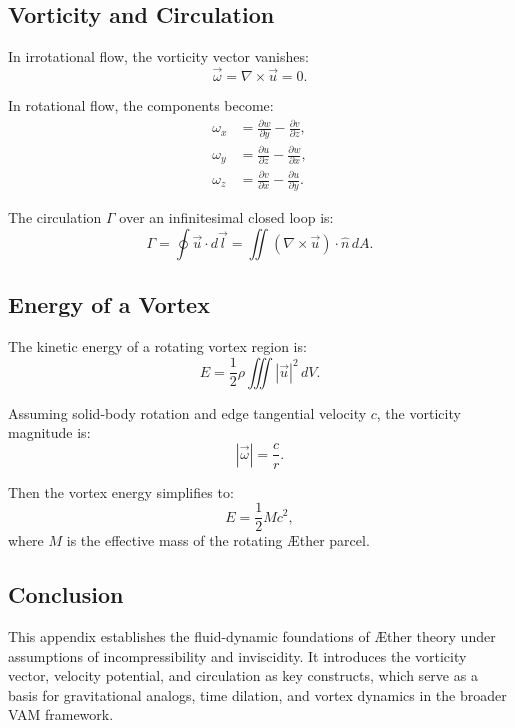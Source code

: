\documentclass[12pt]{article}
\begin{document}
    \subsection{Vorticity and Circulation}
    In irrotational flow, the vorticity vector vanishes:
    \begin{equation}
        \vec{\omega} = \nabla \times \vec{u} = 0.
    \end{equation}

    In rotational flow, the components become:
    \begin{align}
        \omega_x &= \frac{\partial w}{\partial y} - \frac{\partial v}{\partial z}, \\
        \omega_y &= \frac{\partial u}{\partial z} - \frac{\partial w}{\partial x}, \\
        \omega_z &= \frac{\partial v}{\partial x} - \frac{\partial u}{\partial y}.
    \end{align}

    The circulation \(\Gamma\) over an infinitesimal closed loop is:
    \begin{equation}
        \Gamma = \oint \vec{u} \cdot d\vec{l} = \iint (\nabla \times \vec{u}) \cdot \hat{n} \, dA.
    \end{equation}

    \subsection{Energy of a Vortex}
    The kinetic energy of a rotating vortex region is:
    \begin{equation}
        E = \frac{1}{2} \rho \iiint |\vec{u}|^2 \, dV.
    \end{equation}

    Assuming solid-body rotation and edge tangential velocity \(c\), the vorticity magnitude is:
    \begin{equation}
        |\vec{\omega}| = \frac{c}{r}.
    \end{equation}

    Then the vortex energy simplifies to:
    \begin{equation}
        E = \frac{1}{2} M c^2,
    \end{equation}
    where \(M\) is the effective mass of the rotating Æther parcel.

    \subsection*{Conclusion}
    This appendix establishes the fluid-dynamic foundations of Æther theory under assumptions of incompressibility and inviscidity. It introduces the vorticity vector, velocity potential, and circulation as key constructs, which serve as a basis for gravitational analogs, time dilation, and vortex dynamics in the broader VAM framework.

\ifdefined\standalonechapter
\else


\end{document}
